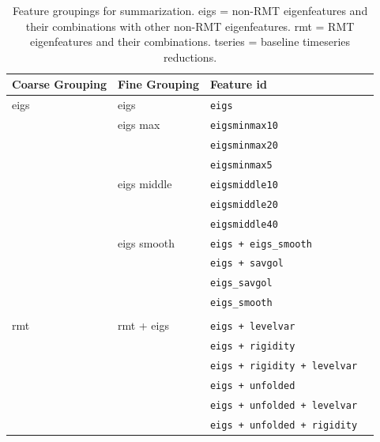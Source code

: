 \documentclass[12pt]{spieman}  %
\newcommand{\tcode}[1]{\footnotesize\texttt{#1}\normalsize}
\begin{document}
\begin{spacing}{2}
\begin{table}[h!]
\caption{
\label{tab:features}
Feature groupings for summarization. eigs = non-RMT eigenfeatures and their
combinations with other non-RMT eigenfeatures. rmt = RMT eigenfeatures and
their combinations. tseries = baseline timeseries reductions.\\
}
\small
\centering
\begin{tabular}{lllr}
\hline
\textbf{Coarse Grouping} & \textbf{Fine Grouping} & \textbf{Feature id} \\
\hline
eigs           & eigs          & \tcode{eigs}                           \\
               & eigs max      & \tcode{eigsminmax10}                   \\
               &               & \tcode{eigsminmax20}                   \\
               &               & \tcode{eigsminmax5}                    \\
               & eigs middle   & \tcode{eigsmiddle10}                   \\
               &               & \tcode{eigsmiddle20}                   \\
               &               & \tcode{eigsmiddle40}                   \\
               & eigs smooth   & \tcode{eigs + eigs\_smooth}            \\
               &               & \tcode{eigs + savgol}                  \\
               &               & \tcode{eigs\_savgol}                   \\
               &               & \tcode{eigs\_smooth}                   \\
               &               &                                        \\
rmt            & rmt + eigs    & \tcode{eigs + levelvar}                \\
               &               & \tcode{eigs + rigidity}                \\
               &               & \tcode{eigs + rigidity + levelvar}     \\
               &               & \tcode{eigs + unfolded}                \\
               &               & \tcode{eigs + unfolded + levelvar}     \\
               &               & \tcode{eigs + unfolded + rigidity}     \\

\end{tabular}
\end{table}
\end{spacing}
\end{document}
